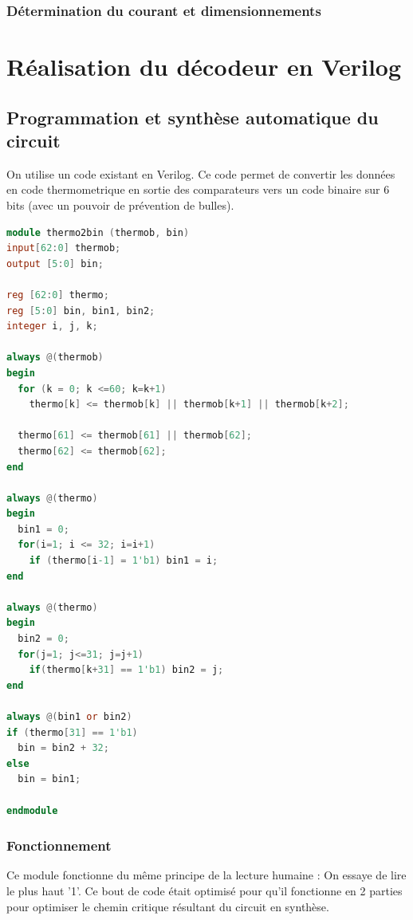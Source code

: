 \documentclass[11pt]{article}
\begin{document}
\subsubsection{D\'etermination du courant et dimensionnements}
\fi

\clearpage

\section{R\'ealisation du d\'ecodeur en Verilog}
\subsection{Programmation et synth\`ese automatique du circuit}
On utilise un code existant en Verilog\cite{Thermometer}.
Ce code permet de convertir les donn\'ees en code thermometrique en sortie des
comparateurs vers un code binaire sur 6 bits (avec un pouvoir de pr\'evention de bulles).

\begin{lstlisting}[language=Verilog, belowskip=-0.5 \baselineskip]
module thermo2bin (thermob, bin)
input[62:0] thermob;
output [5:0] bin;

reg [62:0] thermo;
reg [5:0] bin, bin1, bin2;
integer i, j, k;

always @(thermob)
begin
  for (k = 0; k <=60; k=k+1)
    thermo[k] <= thermob[k] || thermob[k+1] || thermob[k+2];

  thermo[61] <= thermob[61] || thermob[62];
  thermo[62] <= thermob[62];
end

always @(thermo)
begin
  bin1 = 0;
  for(i=1; i <= 32; i=i+1)
    if (thermo[i-1] = 1'b1) bin1 = i;
end

always @(thermo)
begin
  bin2 = 0;
  for(j=1; j<=31; j=j+1)
    if(thermo[k+31] == 1'b1) bin2 = j;
end

always @(bin1 or bin2)
if (thermo[31] == 1'b1)
  bin = bin2 + 32;
else
  bin = bin1;

endmodule

\end{lstlisting}

\subsubsection{Fonctionnement}

Ce module fonctionne du m\^eme principe de la lecture humaine : On essaye de lire le plus
haut '1'. Ce bout de code \'etait optimis\'e pour qu'il fonctionne en 2 parties pour optimiser
le chemin critique r\'esultant du circuit en synth\`ese. 
\end{document}
